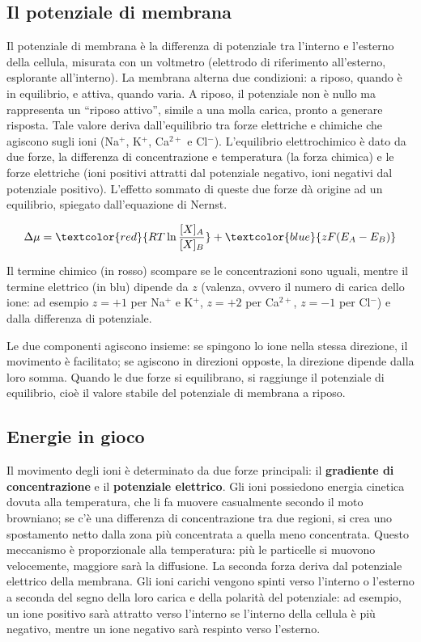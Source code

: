 \documentclass[12pt,a4paper,openany]{book}
\begin{document}
\subsection{Il potenziale di membrana}

Il potenziale di membrana è la differenza di potenziale tra l'interno e l'esterno della cellula, misurata con un voltmetro (elettrodo di riferimento all'esterno, esplorante all'interno). La membrana alterna due condizioni: a riposo, quando è in equilibrio, e attiva, quando varia.
A riposo, il potenziale non è nullo ma rappresenta un ``riposo attivo'', simile a una molla carica, pronto a generare risposta. Tale valore deriva dall'equilibrio tra forze elettriche e chimiche che agiscono sugli ioni (Na$^{+}$, K$^{+}$, Ca$^{2+}$ e Cl$^{-}$).
L'equilibrio elettrochimico è dato da due forze, la differenza di concentrazione e temperatura (la forza chimica) e le forze
elettriche (ioni positivi attratti dal potenziale negativo, ioni negativi dal potenziale positivo).
L'effetto sommato di queste due forze dà origine ad un equilibrio, spiegato dall'equazione di Nernst.

\[
\Delta\mu = \textcolor{red}{RT \ln \frac{[X]_A}{[X]_B}} + \textcolor{blue}{zF(E_A - E_B)}
\]

Il termine chimico (in rosso) scompare se le concentrazioni sono uguali, mentre il termine
elettrico (in blu) dipende da $z$ (valenza, ovvero il numero di carica dello ione: ad esempio
$z=+1$ per Na$^+$ e K$^+$, $z=+2$ per Ca$^{2+}$, $z=-1$ per Cl$^-$) e dalla differenza
di potenziale.

Le due componenti agiscono insieme: se spingono lo ione nella stessa direzione, il movimento è facilitato; se agiscono in direzioni opposte, la direzione dipende dalla loro somma. Quando le due forze si equilibrano, si raggiunge il potenziale di equilibrio, cioè il valore stabile del potenziale di membrana a riposo.


\subsection{Energie in gioco}

Il movimento degli ioni è determinato da due forze principali: il \textbf{gradiente di concentrazione }e il \textbf{potenziale elettrico}.
Gli ioni possiedono energia cinetica dovuta alla temperatura, che li fa muovere casualmente secondo il moto browniano; se c'è una differenza di concentrazione tra due regioni, si crea uno spostamento netto dalla zona più concentrata a quella meno concentrata. Questo meccanismo è proporzionale alla temperatura: più le particelle si muovono velocemente, maggiore sarà la diffusione.
La seconda forza deriva dal potenziale elettrico della membrana. Gli ioni carichi vengono spinti verso l'interno o l'esterno a seconda del segno della loro carica e della polarità del potenziale: ad esempio, un ione positivo sarà attratto verso l'interno se l'interno della cellula è più negativo, mentre un ione negativo sarà respinto verso l'esterno.
\end{document}
